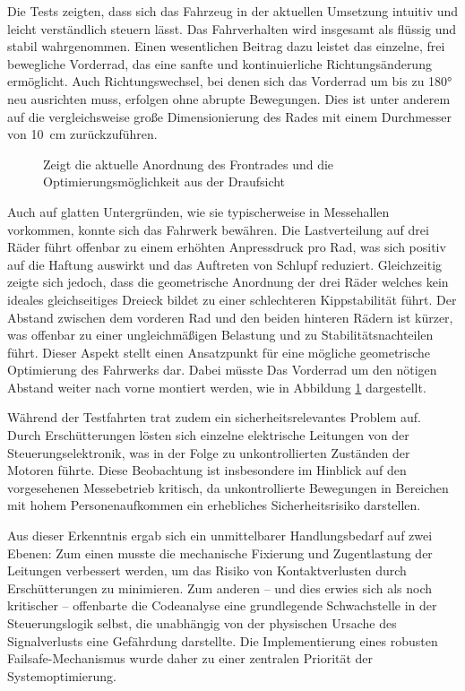 Die Tests zeigten, dass sich das Fahrzeug in der aktuellen Umsetzung intuitiv und leicht verständlich steuern lässt. Das Fahrverhalten wird insgesamt als flüssig und stabil wahrgenommen. Einen wesentlichen Beitrag dazu leistet das einzelne, frei bewegliche Vorderrad, das eine sanfte und kontinuierliche Richtungsänderung ermöglicht. Auch Richtungswechsel, bei denen sich das Vorderrad um bis zu 180° neu ausrichten muss, erfolgen ohne abrupte Bewegungen. Dies ist unter anderem auf die vergleichsweise große Dimensionierung des Rades mit einem Durchmesser von \SI{10}{\centi\meter} zurückzuführen.

\begin{figure}[hbt]
	\centering
	\fbox{%
		
	}
	\caption{Zeigt die aktuelle Anordnung des Frontrades und die Optimierungsmöglichkeit aus der Draufsicht}		
	\label{fig:Räder_Anordnung_Test}
\end{figure}

Auch auf glatten Untergründen, wie sie typischerweise in Messehallen vorkommen, konnte sich das Fahrwerk bewähren. Die Lastverteilung auf drei Räder führt offenbar zu einem erhöhten Anpressdruck pro Rad, was sich positiv auf die Haftung auswirkt und das Auftreten von Schlupf reduziert. Gleichzeitig zeigte sich jedoch, dass die geometrische Anordnung der drei Räder welches kein ideales gleichseitiges Dreieck bildet zu einer schlechteren Kippstabilität führt. Der Abstand zwischen dem vorderen Rad und den beiden hinteren Rädern ist kürzer, was offenbar zu einer ungleichmäßigen Belastung und zu Stabilitätsnachteilen führt. Dieser Aspekt stellt einen Ansatzpunkt für eine mögliche geometrische Optimierung des Fahrwerks dar. Dabei müsste Das Vorderrad um den nötigen Abstand weiter nach vorne montiert werden, wie in Abbildung \ref{fig:Räder_Anordnung_Test} dargestellt.



Während der Testfahrten trat zudem ein sicherheitsrelevantes Problem auf. Durch Erschütterungen lösten sich einzelne elektrische Leitungen von der Steuerungselektronik, was in der Folge zu unkontrollierten Zuständen der Motoren führte. Diese Beobachtung ist insbesondere im Hinblick auf den vorgesehenen Messebetrieb kritisch, da unkontrollierte Bewegungen in Bereichen mit hohem Personenaufkommen ein erhebliches Sicherheitsrisiko darstellen.

Aus dieser Erkenntnis ergab sich ein unmittelbarer Handlungsbedarf auf zwei Ebenen: Zum einen musste die mechanische Fixierung und Zugentlastung der Leitungen verbessert werden, um das Risiko von Kontaktverlusten durch Erschütterungen zu minimieren. Zum anderen -- und dies erwies sich als noch kritischer -- offenbarte die Codeanalyse eine grundlegende Schwachstelle in der Steuerungslogik selbst, die unabhängig von der physischen Ursache des Signalverlusts eine Gefährdung darstellte. Die Implementierung eines robusten Failsafe-Mechanismus wurde daher zu einer zentralen Priorität der Systemoptimierung.


